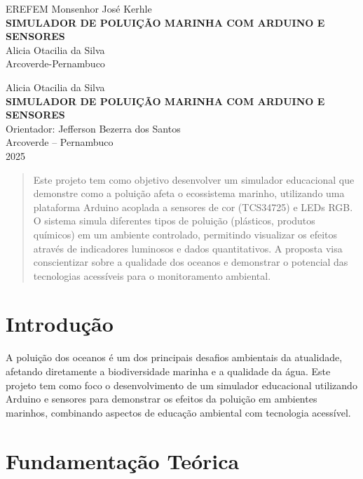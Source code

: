 \documentclass[12pt]{article}
\begin{document}
\begin{titlepage}
    \centering
    {\large EREFEM Monsenhor José Kerhle }\\[2cm]
    {\Large\bfseries SIMULADOR DE POLUIÇÃO MARINHA COM ARDUINO E SENSORES}\\[2cm]
    {\large Alicia Otacilia da Silva }\\[4cm]
    {\large Arcoverde-Pernambuco}
\end{titlepage}

\begin{titlepage}
    \centering
    {\large Alicia Otacilia da Silva}\\[2cm]
    {\Large\bfseries SIMULADOR DE POLUIÇÃO MARINHA COM ARDUINO E SENSORES}\\[1.5cm]
    Orientador: Jefferson Bezerra dos Santos \\[3cm]
    {\large Arcoverde -- Pernambuco}\\
    {\large 2025}
\end{titlepage}

\begin{abstract}
    Este projeto tem como objetivo desenvolver um simulador educacional que demonstre como a poluição afeta o ecossistema marinho, utilizando uma plataforma Arduino acoplada a sensores de cor (TCS34725) e LEDs RGB. O sistema simula diferentes tipos de poluição (plásticos, produtos químicos) em um ambiente controlado, permitindo visualizar os efeitos através de indicadores luminosos e dados quantitativos. A proposta visa conscientizar sobre a qualidade dos oceanos e demonstrar o potencial das tecnologias acessíveis para o monitoramento ambiental.
\end{abstract}

\tableofcontents
\newpage

\section{Introdução}
A poluição dos oceanos é um dos principais desafios ambientais da atualidade, afetando diretamente a biodiversidade marinha e a qualidade da água. Este projeto tem como foco o desenvolvimento de um simulador educacional utilizando Arduino e sensores para demonstrar os efeitos da poluição em ambientes marinhos, combinando aspectos de educação ambiental com tecnologia acessível.

\section{Fundamentação Teórica}
\end{document}
